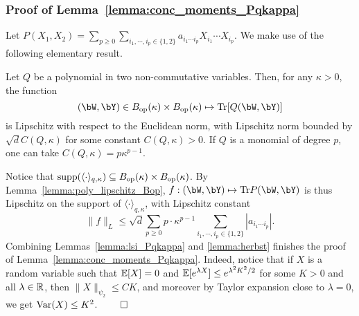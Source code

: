 \subsubsection{Proof of Lemma~\ref{lemma:conc_moments_Pqkappa}}\label{subsubsec:proof_conc_moments_Pqkappa}

Let $P(X_1, X_2) = \sum_{p\geq 0}\sum_{i_1, \cdots, i_p \in \{1,2\}} a_{i_1 \cdots i_p} X_{i_1} \cdots X_{i_p}$.
We make use of the following elementary result.
\begin{lemma}\label{lemma:poly_lipschitz_Bop}
    Let $Q$ be a polynomial in two non-commutative variables.  
    Then, for any $\kappa > 0$, the function 
    \begin{equation*}
        (\bW , \bY) \in B_\op(\kappa) \times B_\op(\kappa) \mapsto \Tr[Q(\bW, \bY)]
    \end{equation*}
    is Lipschitz with respect to the Euclidean norm, with Lipschitz norm bounded by $\sqrt{d} C(Q, \kappa)$ for some constant $C(Q, \kappa) > 0$. 
    If $Q$ is a monomial of degree $p$, one can take $C(Q, \kappa) = p \kappa^{p-1}$.
\end{lemma}
\noindent
Notice that $\operatorname*{supp}(\langle \cdot \rangle_{q,\kappa}) \subseteq B_{\mathrm{op}}(\kappa) \times B_{\mathrm{op}}(\kappa)$.
By Lemma~\ref{lemma:poly_lipschitz_Bop}, $f:(\bW, \bY) \mapsto \Tr P(\bW, \bY)$ is thus Lipschitz on the support of $\langle \cdot \rangle_{q,\kappa}$, 
with Lipschitz constant
\begin{equation*}
    \|f\|_L \leq \sqrt{d} \sum_{p \geq 0} p \cdot \kappa^{p-1} \sum_{i_1, \cdots, i_p \in \{1,2\}} |a_{i_1 \cdots i_p}|.
\end{equation*}
Combining Lemmas~\ref{lemma:lsi_Pqkappa} and \ref{lemma:herbst} finishes the proof of Lemma~\ref{lemma:conc_moments_Pqkappa}.
Indeed, notice that if $X$ is a random variable such that $\mathbb{E}[X] = 0$ and 
$\mathbb{E}[e^{\lambda X}] \leq e^{\lambda^2 K^2 / 2}$ for some $K > 0$ and all $\lambda \in \mathbb{R}$, 
then $\|X\|_{\psi_2} \leq C K$, and moreover
by Taylor expansion close to $\lambda = 0$, we get $\mathrm{Var}(X) \leq K^2$.
$\qed$
